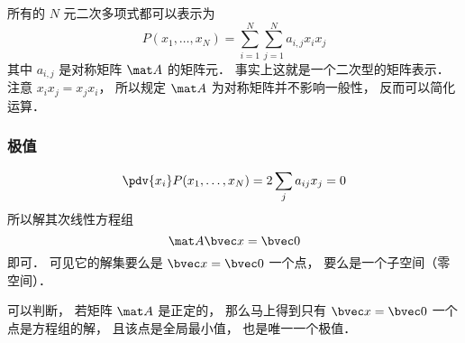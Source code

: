 

所有的 $N$ 元二次多项式都可以表示为
\begin{equation}
P(x_1,\dots,x_N) = \sum_{i=1}^N\sum_{j=1}^N a_{i,j}x_i x_j
\end{equation}
其中 $a_{i,j}$ 是对称矩阵 $\mat A$ 的矩阵元． 事实上这就是一个二次型的矩阵表示． 注意 $x_i x_j = x_j x_i$， 所以规定 $\mat A$ 为对称矩阵并不影响一般性， 反而可以简化运算．

\subsubsection{极值}
\begin{equation}
\pdv{x_i}P(x_1,\dots,x_N) = 2\sum_j a_{ij} x_j = 0
\end{equation}
所以解其次线性方程组
\begin{equation}
\mat A \bvec x = \bvec 0
\end{equation}
即可． 可见它的解集要么是 $\bvec x = \bvec 0$ 一个点， 要么是一个子空间（零空间）．

可以判断， 若矩阵 $\mat A$ 是正定的， 那么马上得到只有 $\bvec x = \bvec 0$ 一个点是方程组的解， 且该点是全局最小值， 也是唯一一个极值． 
